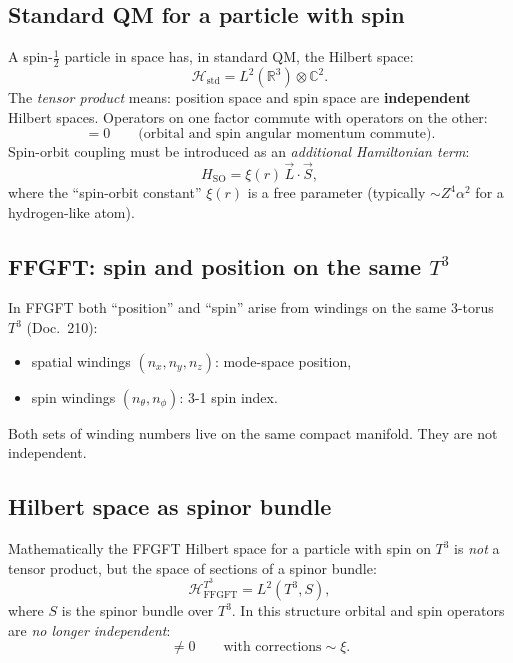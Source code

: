 \subsection{Standard QM for a particle with spin}

A spin-$\tfrac{1}{2}$ particle in space has, in standard QM, the
Hilbert space:
\begin{equation}
  \mathcal{H}_{\text{std}} = L^2(\mathbb{R}^3) \otimes \mathbb{C}^2.
\end{equation}
The \emph{tensor product} means: position space and spin space are
\textbf{independent} Hilbert spaces. Operators on one factor commute
with operators on the other:
\begin{equation}
  [L_i, S_j] = 0
  \qquad \text{(orbital and spin angular momentum commute)}.
\end{equation}
Spin-orbit coupling must be introduced as an \emph{additional
Hamiltonian term}:
\begin{equation}
  H_{\text{SO}} = \xi(r)\, \vec L \cdot \vec S,
\end{equation}
where the \enquote{spin-orbit constant} $\xi(r)$ is a free parameter
(typically $\sim Z^4 \alpha^2$ for a hydrogen-like atom).

\subsection{FFGFT: spin and position on the same $T^3$}

In FFGFT both \enquote{position} and \enquote{spin} arise from
windings on the same 3-torus $T^3$ (Doc.~210):
\begin{itemize}[leftmargin=2em,itemsep=2pt,topsep=2pt]
  \item spatial windings $(n_x, n_y, n_z)$: mode-space position,
  \item spin windings $(n_\theta, n_\phi)$: 3-1 spin index.
\end{itemize}
Both sets of winding numbers live on the same compact manifold.
They are not independent.

\subsection{Hilbert space as spinor bundle}

Mathematically the FFGFT Hilbert space for a particle with spin on
$T^3$ is \emph{not} a tensor product, but the space of sections of a
spinor bundle:
\begin{equation}
  \boxed{
    \mathcal{H}^{T^3}_{\text{FFGFT}}
    = L^2(T^3, S),
  }
\end{equation}
where $S$ is the spinor bundle over $T^3$. In this structure orbital
and spin operators are \emph{no longer independent}:
\begin{equation}
  [L_i, S_j] \neq 0
  \qquad \text{with corrections} \sim \xi.
\end{equation}

